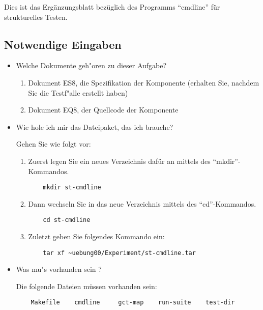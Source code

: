 
Dies ist das Erg\"anzungsblatt bez\"uglich des Programms "`cmdline"'
f\"ur strukturelles Testen.

\bigskip

\subsection*{Notwendige Eingaben}

\begin{itemize}

\item Welche Dokumente geh"oren zu dieser Aufgabe?

\begin{enumerate}
\item Dokument ES8, die Spezifikation der Komponente (erhalten Sie, nachdem
	Sie die Testf"alle erstellt haben)
\item Dokument EQ8, der Quellcode der Komponente
\end{enumerate}

\item Wie hole ich mir das Dateipaket, das ich brauche?

Gehen Sie wie folgt vor:

\begin{enumerate}

\item Zuerst legen Sie ein neues Verzeichnis daf\"ur an mittels des 
"`mkdir"'-Kommandos.
\begin{verbatim}
    mkdir st-cmdline
\end{verbatim}

\item Dann wechseln Sie in das neue Verzeichnis mittels des 
"`cd"'-Kommandos.
\begin{verbatim}
    cd st-cmdline
\end{verbatim}

\item Zuletzt geben Sie folgendes Kommando ein:
\begin{verbatim}
    tar xf ~uebung00/Experiment/st-cmdline.tar
\end{verbatim}

\end{enumerate}

\item Was mu"s vorhanden sein ?

Die folgende Dateien m\"ussen vorhanden sein:
\begin{verbatim}
    Makefile    cmdline     gct-map    run-suite    test-dir
\end{verbatim}


\end{itemize}



